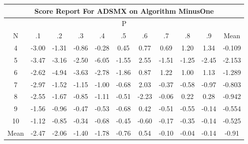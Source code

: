 \documentclass[11pt,a4paper]{report}
\begin{document}
\begin{longtable}{ | c || c | c | c | c | c | c | c | c | c || c |}
\hline
\multicolumn{11}{|c|}{ Score Report For ADSMX on Algorithm MinusOne} \\
\hline
\multicolumn{11}{|c|}{ P } \\
\hline
N & .1 & .2 & .3 & .4 & .5 & .6 & .7 & .8 & .9 & Mean\\
 \hline
 \hline
 \endhead
  4 &  \cellcolor[HTML]{FFB7B7} -3.00 &  \cellcolor[HTML]{FFDFDF} -1.31 &  \cellcolor[HTML]{FFE7E7} -0.86 &  \cellcolor[HTML]{FFF7F7} -0.28 &  \cellcolor[HTML]{F7F7FF} 0.45 &  \cellcolor[HTML]{EFEFFF} 0.77 &  \cellcolor[HTML]{EFEFFF} 0.69 &  \cellcolor[HTML]{DFDFFF} 1.20 &  \cellcolor[HTML]{DFDFFF} 1.34 & -0.109 \\
  5 &  \cellcolor[HTML]{FFA7A7} -3.47 &  \cellcolor[HTML]{FFAFAF} -3.16 &  \cellcolor[HTML]{FFBFBF} -2.50 &  \cellcolor[HTML]{FF6868} -6.05 &  \cellcolor[HTML]{FFD7D7} -1.55 &  \cellcolor[HTML]{BFBFFF} 2.55 &  \cellcolor[HTML]{FFD7D7} -1.51 &  \cellcolor[HTML]{FFDFDF} -1.25 &  \cellcolor[HTML]{FFBFBF} -2.45 & -2.153 \\
  6 &  \cellcolor[HTML]{FFBFBF} -2.62 &  \cellcolor[HTML]{FF8080} -4.94 &  \cellcolor[HTML]{FFA7A7} -3.63 &  \cellcolor[HTML]{FFB7B7} -2.78 &  \cellcolor[HTML]{FFCFCF} -1.86 &  \cellcolor[HTML]{E7E7FF} 0.87 &  \cellcolor[HTML]{DFDFFF} 1.22 &  \cellcolor[HTML]{E7E7FF} 1.00 &  \cellcolor[HTML]{DFDFFF} 1.13 & -1.289 \\
  7 &  \cellcolor[HTML]{FFB7B7} -2.97 &  \cellcolor[HTML]{FFD7D7} -1.52 &  \cellcolor[HTML]{FFDFDF} -1.15 &  \cellcolor[HTML]{FFE7E7} -1.00 &  \cellcolor[HTML]{FFEFEF} -0.68 &  \cellcolor[HTML]{CFCFFF} 2.03 &  \cellcolor[HTML]{FFF7F7} -0.37 &  \cellcolor[HTML]{FFEFEF} -0.58 &  \cellcolor[HTML]{FFE7E7} -0.97 & -0.803 \\
  8 &  \cellcolor[HTML]{FFBFBF} -2.55 &  \cellcolor[HTML]{FFD7D7} -1.67 &  \cellcolor[HTML]{FFE7E7} -0.85 &  \cellcolor[HTML]{FFE7E7} -1.11 &  \cellcolor[HTML]{FFEFEF} -0.51 &  \cellcolor[HTML]{FFC7C7} -2.23 &  \cellcolor[HTML]{FFFFFF} -0.06 &  \cellcolor[HTML]{F7F7FF} 0.22 &  \cellcolor[HTML]{F7F7FF} 0.28 & -0.942 \\
  9 &  \cellcolor[HTML]{FFD7D7} -1.56 &  \cellcolor[HTML]{FFE7E7} -0.96 &  \cellcolor[HTML]{FFF7F7} -0.47 &  \cellcolor[HTML]{FFEFEF} -0.53 &  \cellcolor[HTML]{FFEFEF} -0.68 &  \cellcolor[HTML]{F7F7FF} 0.42 &  \cellcolor[HTML]{FFEFEF} -0.51 &  \cellcolor[HTML]{FFEFEF} -0.55 &  \cellcolor[HTML]{FFFFFF} -0.14 & -0.554 \\
  10 &  \cellcolor[HTML]{FFDFDF} -1.12 &  \cellcolor[HTML]{FFE7E7} -0.85 &  \cellcolor[HTML]{FFF7F7} -0.34 &  \cellcolor[HTML]{FFEFEF} -0.68 &  \cellcolor[HTML]{FFF7F7} -0.45 &  \cellcolor[HTML]{FFEFEF} -0.60 &  \cellcolor[HTML]{FFF7F7} -0.17 &  \cellcolor[HTML]{FFF7F7} -0.35 &  \cellcolor[HTML]{FFFFFF} -0.14 & -0.525 \\
 \hline
 \hline
Mean &  \cellcolor[HTML]{FFBFBF} -2.47 &  \cellcolor[HTML]{FFCFCF} -2.06 &  \cellcolor[HTML]{FFDFDF} -1.40 &  \cellcolor[HTML]{FFCFCF} -1.78 &  \cellcolor[HTML]{FFEFEF} -0.76 &  \cellcolor[HTML]{EFEFFF} 0.54 &  \cellcolor[HTML]{FFFFFF} -0.10 &  \cellcolor[HTML]{FFFFFF} -0.04 &  \cellcolor[HTML]{FFFFFF} -0.14 &  \cellcolor[HTML]{FFE7E7} -0.91
\end{longtable}
\end{document}
